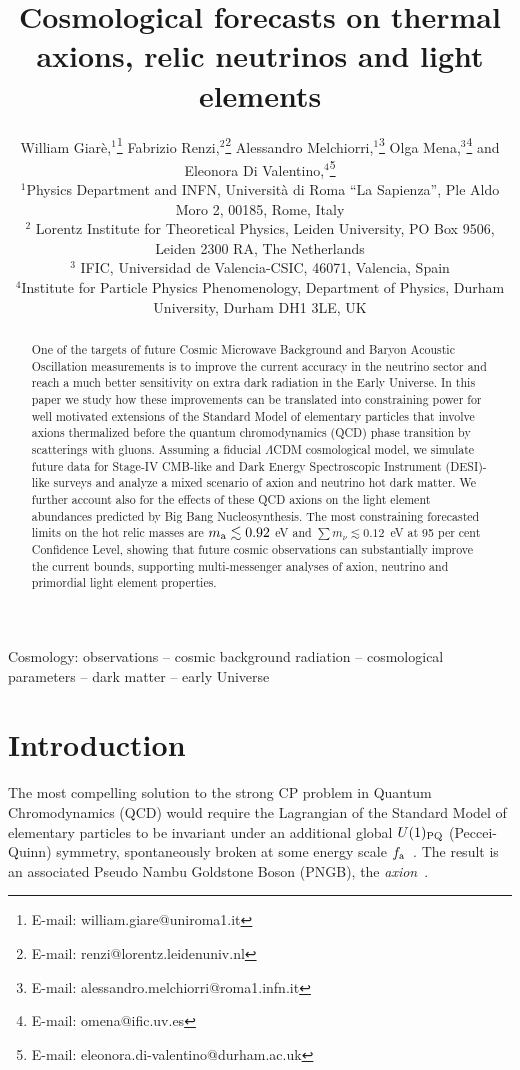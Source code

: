 \documentclass[fleqn,usenatbib,letters]{mnras}
\title[Forecasts on axions, neutrinos and light elements]{Cosmological forecasts on thermal axions, relic neutrinos and light elements}
\author[W. Giarè, F. Renzi, A. Melchiorri, O. Mena and E. Di Valentino]{
William Giarè,$^{1}$\thanks{E-mail: william.giare@uniroma1.it }
Fabrizio Renzi,$^{2}$\thanks{E-mail: renzi@lorentz.leidenuniv.nl }
Alessandro Melchiorri,$^{1}$\thanks{E-mail: alessandro.melchiorri@roma1.infn.it}
Olga Mena,$^{3}$\thanks{E-mail: omena@ific.uv.es}
and Eleonora Di Valentino,$^{4}$\thanks{E-mail: eleonora.di-valentino@durham.ac.uk}
\\
$^{1}$Physics Department and INFN, Universit\`a di Roma ``La Sapienza'', Ple Aldo Moro 2, 00185, Rome, Italy\\
$^{2}$ Lorentz Institute for Theoretical Physics, Leiden University, PO Box 9506, Leiden 2300 RA, The Netherlands\\
$^{3}$ IFIC, Universidad de Valencia-CSIC, 46071, Valencia, Spain
\\
$^{4}$Institute for Particle Physics Phenomenology, Department of Physics, Durham University, Durham DH1 3LE, UK}
\begin{document}
\label{firstpage}
\pagerange{\pageref{firstpage}--\pageref{lastpage}}
\maketitle

\begin{abstract}
One of the targets of future Cosmic Microwave Background and Baryon Acoustic Oscillation measurements is to improve the current accuracy in the neutrino sector and reach a much better sensitivity on extra dark radiation in the Early Universe. In this paper we study how these improvements can be translated into constraining power for well motivated extensions of the Standard Model of elementary particles that involve axions thermalized before the quantum chromodynamics (QCD) phase transition by scatterings with gluons. Assuming a fiducial $\Lambda$CDM cosmological model, we simulate future data for Stage-IV CMB-like and Dark Energy Spectroscopic Instrument (DESI)-like surveys and analyze a mixed scenario of axion and neutrino hot dark matter. We further account also for the effects of these QCD axions on the light element abundances predicted by Big Bang Nucleosynthesis. The most constraining forecasted limits on the hot relic masses are  $m_{\rm a} \lesssim 0.92$ eV and $\sum m_\nu\lesssim 0.12$~eV at 95 per cent Confidence Level, showing that future cosmic observations can substantially improve the current bounds, supporting multi-messenger analyses of axion, neutrino and primordial light element properties.
\end{abstract}


\begin{keywords}
Cosmology: observations -- cosmic background radiation -- cosmological parameters -- dark matter -- early Universe
\end{keywords}



\section{Introduction} \label{sec.Introduction}
The most compelling solution to the strong CP problem in Quantum Chromodynamics (QCD) would require the Lagrangian of the Standard Model of elementary particles to be invariant under an additional global $U(1)_{\rm PQ}$ (Peccei-Quinn) symmetry, spontaneously broken at some energy scale $f_{\rm a}$~\citep{Weinberg:1975ui,Nanopoulos:1973wz,Weinberg:1973un,Belavin:1975fg,Callan:1976je,Jackiw:1976pf,Shifman:1979if,Kim:1979if,Dine:1981rt,Peccei:1988ci,Peccei:2006as,Peccei:1977hh,Peccei:1977ur,Wilczek:1977pj,Berezhiani:1989fp,Berezhiani:1992rk}. The result is an associated Pseudo Nambu Goldstone Boson (PNGB), the \emph{axion}~\citep{Weinberg:1977ma,Kim:1986ax,Shifman:1979if,Kim:1979if,Dine:1981rt,Cheng:1987gp,Peccei:1988ci,Peccei:2006as,Marsh:2015xka, DiLuzio:2020wdo,Sikivie:2006ni}. 
\end{document}
